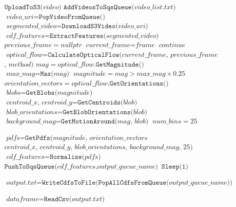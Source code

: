 \begin{figure}[h]
\begin{algorithmic}[1]

    \State $\texttt{UploadToS3(}\textit{video}\texttt{)}$
  \EndFor
  \State $\texttt{AddVideosToSqsQueue(}\textit{video\_list.txt}\texttt{)}$
  \State $\textit{video\_uri} = \texttt{PopVideoFromQueue()}$
  \State $\textit{segmented\_video} = \texttt{DownloadS3Video(}\textit{video\_uri}\texttt{)}$
  \State $\textit{cdf\_features} = \texttt{ExtractFeatures(}\textit{segmented\_video}\texttt{)}$
  \State $\textit{previous\_frame} = nullptr$
    \State $\textit{current\_frame} = \textit{frame}$
      \State $continue$
    \EndIf
    \State $\textit{optical\_flow} = \texttt{CalculateOpticalFlow(}\textit{current\_frame, previous\_frame}$
    \Statex $\textit{, method} \texttt{)}$
    \State $\textit{mag} = \textit{optical\_flow}.\texttt{GetMagnitude()}$
    \State $\textit{max\_mag} = \texttt{Max(} \textit{mag} \texttt{)}$
    \State $\textit{magnitude} = \textit{mag} > \textit{max\_mag} \times 0.25$
    \State $\textit{orientation\_vectors} = \textit{optical\_flow}.\texttt{GetOrientations()}$
    \State $\textit{blobs} = \texttt{GetBlobs(} \textit{magnitude}\texttt{)}$
      \State $\textit{centroid\_x, centroid\_y} = \texttt{GetCentroids(} \textit{blob} \texttt{)}$
      \State $\textit{blob\_orientations} = \texttt{GetBlobOrientations(} \textit{blob} \texttt{)}$
      \State $\textit{background\_mag} = \texttt{GetMotionAround(} \textit{mag, blob} \texttt{)}$
    \EndFor
    \State $\textit{num\_bins} = 25$

    \State $\textit{pdfs} = \texttt{GetPdfs(} \textit{magnitude, orientation\_vectors} $
    \Statex $\textit{centroid\_x, centroid\_y, blob\_orientations, background\_mag, 25} \texttt{)}$
  \EndFor
  \State $\textit{cdf\_features} = \texttt{Normalize(}\textit{pdfs}\texttt{)}$
  \State $\texttt{PushToSqsQueue(}\textit{cdf\_features}, \textit{output\_queue\_name} \texttt{)}$
    \State $\texttt{Sleep(1)}$
  \EndWhile

  \State $\textit{output.txt} = \texttt{WriteCdfsToFile(PopAllCdfsFromQueue(}\textit{output\_queue\_name} \texttt{))}$

  \State $\textit{dataframe} = \texttt{ReadCsv(} \textit{output.txt} \texttt{)}$


\end{algorithmic}
\end{figure}
